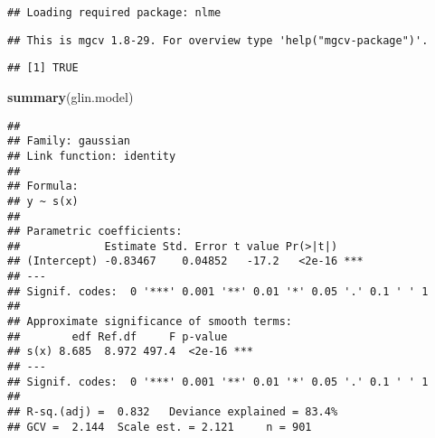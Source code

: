 \documentclass[]{article}
\newenvironment{Shaded}{\begin{snugshade}}{\end{snugshade}}
\newcommand{\CommentTok}[1]{\textcolor[rgb]{0.56,0.35,0.01}{\textit{#1}}}
\newcommand{\DataTypeTok}[1]{\textcolor[rgb]{0.13,0.29,0.53}{#1}}
\newcommand{\DecValTok}[1]{\textcolor[rgb]{0.00,0.00,0.81}{#1}}
\newcommand{\KeywordTok}[1]{\textcolor[rgb]{0.13,0.29,0.53}{\textbf{#1}}}
\newcommand{\NormalTok}[1]{#1}
\newcommand{\OperatorTok}[1]{\textcolor[rgb]{0.81,0.36,0.00}{\textbf{#1}}}
\newcommand{\StringTok}[1]{\textcolor[rgb]{0.31,0.60,0.02}{#1}}
\begin{document}
\begin{verbatim}
## Loading required package: nlme
\end{verbatim}

\begin{verbatim}
## This is mgcv 1.8-29. For overview type 'help("mgcv-package")'.
\end{verbatim}

\begin{Shaded}
\end{Shaded}

\begin{verbatim}
## [1] TRUE
\end{verbatim}

\begin{Shaded}
\begin{Highlighting}[]
\KeywordTok{summary}\NormalTok{(glin.model)}
\end{Highlighting}
\end{Shaded}

\begin{verbatim}
## 
## Family: gaussian 
## Link function: identity 
## 
## Formula:
## y ~ s(x)
## 
## Parametric coefficients:
##             Estimate Std. Error t value Pr(>|t|)    
## (Intercept) -0.83467    0.04852   -17.2   <2e-16 ***
## ---
## Signif. codes:  0 '***' 0.001 '**' 0.01 '*' 0.05 '.' 0.1 ' ' 1
## 
## Approximate significance of smooth terms:
##        edf Ref.df     F p-value    
## s(x) 8.685  8.972 497.4  <2e-16 ***
## ---
## Signif. codes:  0 '***' 0.001 '**' 0.01 '*' 0.05 '.' 0.1 ' ' 1
## 
## R-sq.(adj) =  0.832   Deviance explained = 83.4%
## GCV =  2.144  Scale est. = 2.121     n = 901
\end{verbatim}

\begin{Shaded}
\end{Shaded}
\end{document}
